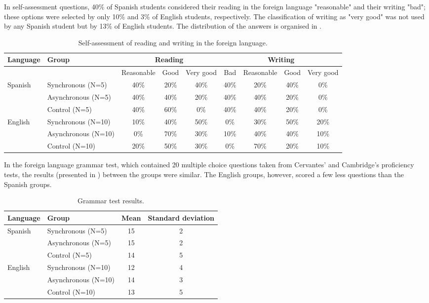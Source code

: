 \documentclass{textolivre}
\begin{document}
In self-assessment questions, 40\% of Spanish students considered their
reading in the foreign language "reasonable" and their writing "bad";
these options were selected by only 10\% and 3\% of English students,
respectively. The classification of writing as "very good" was not used
by any Spanish student but by 13\% of English students. The distribution
of the answers is organised in .

%
%
\begin{table}[htpb]
\caption{Self-assessment of reading and writing in the foreign language.}
\label{tbl02}
\small
\begin{adjustbox}{max width=\textwidth}
\begin{tabular}{llccc|cccc}
\toprule
Language & Group & \multicolumn{3}{c}{Reading} & \multicolumn{4}{c}{Writing} \\
\midrule
 & & Reasonable & Good & Very good & Bad & Reasonable & Good & Very good \\
\multirow{3}{*}{Spanish} & Synchronous (N=5) & 40\% & 20\% & 40\% & 40\% & 20\% & 40\% & 0\% \\
& Asynchronous (N=5) & 40\% & 40\% & 20\% & 40\% & 40\% & 20\% & 0\% \\
& Control (N=5) & 40\% & 60\% & 0\% & 40\% & 40\% & 20\% & 0\% \\
\midrule
\multirow{3}{*}{English} & Synchronous (N=10) & 10\% & 40\% & 50\% & 0\% & 30\% & 50\% & 20\% \\
 & Asynchronous (N=10) & 0\% & 70\% & 30\% & 10\% & 40\% & 40\% & 10\% \\
 & Control (N=10) & 20\% & 50\% & 30\% & 0\% & 70\% & 20\% & 10\% \\
\bottomrule
\end{tabular}
\end{adjustbox}
\end{table}


In the foreign language grammar test, which contained 20 multiple choice
questions taken from Cervantes' and Cambridge's proficiency tests, the
results (presented in ) between the groups were similar. The
English groups, however, scored a few less questions than the Spanish
groups.

%
%
\begin{table}[htpb]
\caption{Grammar test results.}
\label{tbl03}
\small
\centering
\begin{tabular}{llcc}
\toprule
Language & Group & Mean & Standard deviation \\
\midrule
\multirow{3}{*}{Spanish} & Synchronous (N=5) & 15 & 2 \\
& Asynchronous (N=5) & 15 & 2 \\
& Control (N=5) & 14 & 5 \\
\midrule
\multirow{3}{*}{English} & Synchronous (N=10) & 12 & 4 \\
 & Asynchronous (N=10) & 14 & 3 \\
 & Control (N=10) & 13 & 5 \\
\bottomrule
\end{tabular}
\end{table}
\end{document}
